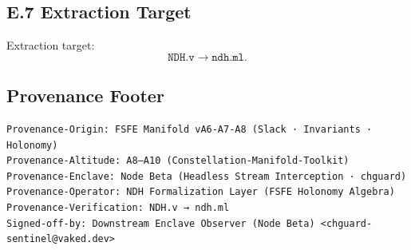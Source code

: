 \subsection{E.7 Extraction Target}

Extraction target:
\[
\texttt{NDH.v} \rightarrow \texttt{ndh.ml}.
\]

\subsection*{Provenance Footer}

\begin{verbatim}
Provenance-Origin: FSFE Manifold vA6-A7-A8 (Slack · Invariants · Holonomy)
Provenance-Altitude: A8–A10 (Constellation-Manifold-Toolkit)
Provenance-Enclave: Node Beta (Headless Stream Interception · chguard)
Provenance-Operator: NDH Formalization Layer (FSFE Holonomy Algebra)
Provenance-Verification: NDH.v → ndh.ml
Signed-off-by: Downstream Enclave Observer (Node Beta) <chguard-sentinel@vaked.dev>
\end{verbatim}
